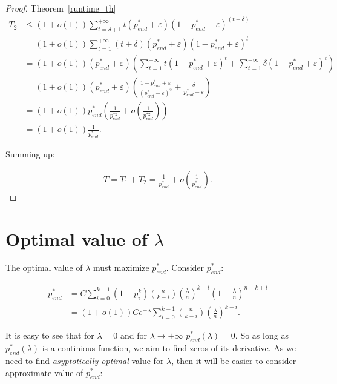\documentclass{article}
\begin{document}
\begin{proof}{Theorem~\ref{runtime_th}}
\begin{align*}
  T_2 &\le (1 + o(1)) \sum\limits_{t = \delta + 1}^{+\infty} t (p_{end}^* + \varepsilon) (1 - p_{end}^* + \varepsilon)^{(t - \delta)} \\
  &= (1 + o(1)) \sum\limits_{t = 1}^{+\infty} (t + \delta) (p_{end}^* + \varepsilon) (1 - p_{end}^* + \varepsilon)^t \\
  &= (1 + o(1)) (p_{end}^* + \varepsilon) \left(\sum\limits_{t = 1}^{+\infty} t (1 - p_{end}^* + \varepsilon)^t +  \sum\limits_{t = 1}^{+\infty} \delta (1 - p_{end}^* + \varepsilon)^t \right) \\
  &= (1 + o(1)) (p_{end}^* + \varepsilon) \left( \frac{1 - p_{end}^* + \varepsilon}{(p_{end}^* - \varepsilon)^2} + \frac{\delta}{p_{end}^* - \varepsilon}\right) \\
  &= (1 + o(1)) p_{end}^* \left( \frac{1}{p_{end}^{*2}} + o\left(\frac{1}{p_{end}^{*2}}\right)\right) \\
  &= (1 + o(1))  \frac{1}{p_{end}^*}.
\end{align*}

Summing up:

\begin{align*}
T = T_1 + T_2 = \frac{1}{p_{end}^*} + o\left(\frac{1}{p_{end}^*}\right).
\end{align*}

\end{proof}

\section{Optimal value of $\lambda$}

The optimal value of $\lambda$ must maximize $p_{end}^*$. Consider $p_{end}^*:$

\begin{align*}
p_{end}^* &= C\sum\limits_{i = 0}^{k - 1} (1 - p_i^k) \binom{n}{k - i} \left( \frac{\lambda}{n} \right)^{k - i}  \left(1 - \frac{\lambda}{n} \right)^{n - k + i} \\
&= (1 + o(1))Ce^{-\lambda}\sum\limits_{i = 0}^{k - 1} \binom{n}{k - i} \left( \frac{\lambda}{n} \right)^{k - i}.
\end{align*}

It is easy to see that for $\lambda = 0$ and for $\lambda \to +\infty$ $p_{end}^*(\lambda) = 0$. So as long as $p_{end}^*(\lambda)$ is a continious function, we aim to find zeros of its derivative. As we need to find \textit{asyptotically optimal} value for $\lambda$, then it will be easier to consider approximate value of $p_{end}^*:$
\end{document}
